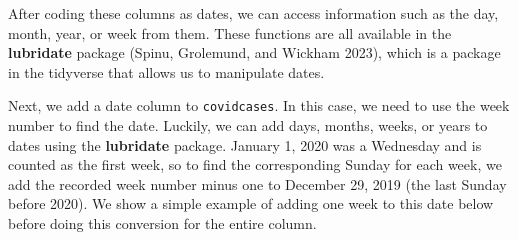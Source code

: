 \documentclass[
  letterpaper,
]{krantz}
\makeatletter
\newenvironment{Shaded}{\begin{snugshade}}{\end{snugshade}}
\newcommand{\AttributeTok}[1]{\textcolor[rgb]{0.40,0.45,0.13}{#1}}
\newcommand{\CommentTok}[1]{\textcolor[rgb]{0.37,0.37,0.37}{#1}}
\newcommand{\DecValTok}[1]{\textcolor[rgb]{0.68,0.00,0.00}{#1}}
\newcommand{\FunctionTok}[1]{\textcolor[rgb]{0.28,0.35,0.67}{#1}}
\newcommand{\NormalTok}[1]{\textcolor[rgb]{0.00,0.23,0.31}{#1}}
\newcommand{\OtherTok}[1]{\textcolor[rgb]{0.00,0.23,0.31}{#1}}
\newcommand{\SpecialCharTok}[1]{\textcolor[rgb]{0.37,0.37,0.37}{#1}}
\newcommand{\StringTok}[1]{\textcolor[rgb]{0.13,0.47,0.30}{#1}}
\newenvironment{kframe}{%
\medskip{}
\setlength{\fboxsep}{.8em}
 \def\at@end@of@kframe{}%
 \ifinner\ifhmode%
  \def\at@end@of@kframe{\end{minipage}}%
  \begin{minipage}{\columnwidth}%
 \fi\fi%
 \def\FrameCommand##1{\hskip\@totalleftmargin \hskip-\fboxsep
 \colorbox{shadecolor}{##1}\hskip-\fboxsep
     \hskip-\linewidth \hskip-\@totalleftmargin \hskip\columnwidth}%
 \MakeFramed {\advance\hsize-\width
   \@totalleftmargin\z@ \linewidth\hsize
   \@setminipage}}%
 {\par\unskip\endMakeFramed%
 \at@end@of@kframe}
\renewenvironment{Shaded}{\begin{kframe}}{\end{kframe}}
\makeatother
\begin{document}
\begin{Shaded}
\end{Shaded}

After coding these columns as dates, we can access information such as
the day, month, year, or week from them. These functions are all
available in the \textbf{lubridate} package (Spinu, Grolemund, and
Wickham 2023), which is a package in the tidyverse that allows us to
manipulate dates.

\begin{Shaded}
\end{Shaded}

Next, we add a date column to \texttt{covidcases}. In this case, we need
to use the week number to find the date. Luckily, we can add days,
months, weeks, or years to dates using the \textbf{lubridate} package.
January 1, 2020 was a Wednesday and is counted as the first week, so to
find the corresponding Sunday for each week, we add the recorded week
number minus one to December 29, 2019 (the last Sunday before 2020). We
show a simple example of adding one week to this date below before doing
this conversion for the entire column.
\end{document}
